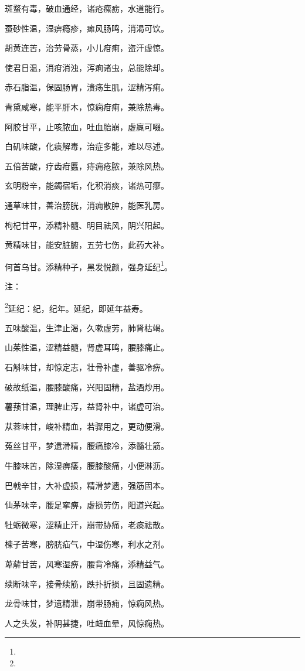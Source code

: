 \documentclass[a4paper,12pt,UTF8,twoside]{ctexbook}
\begin{document}
斑蝥有毒，破血通经，诸疮瘰疬，水道能行。

蚕砂性温，湿痹瘾疹，瘫风肠鸣，消渴可饮。

胡黄连苦，治劳骨蒸，小儿疳痢，盗汗虚惊。

使君日温，消疳消浊，泻痢诸虫，总能除却。

赤石脂温，保固肠胃，溃疡生肌，涩精泻痢。

青黛咸寒，能平肝木，惊痫疳痢，兼除热毒。

阿胶甘平，止咳脓血，吐血胎崩，虚羸可啜。

白矶味酸，化痰解毒，治症多能，难以尽述。

五倍苦酸，疗齿疳䘌，痔痈疮脓，兼除风热。

玄明粉辛，能蠲宿垢，化积消痰，诸热可瘳。

通草味甘，善治膀胱，消痈散肿，能医乳房。

枸杞甘平，添精补髓、明目祛风，阴兴阳起。

黄精味甘，能安脏腑，五劳七伤，此药大补。

何首乌甘。添精种子，黑发悦颜，强身延纪\footnote{}。

注：

\footnote{}延纪：纪，纪年。延纪，即延年益寿。

五味酸温，生津止渴，久嗽虚劳，肺肾枯竭。

山茱性温，涩精益髓，肾虚耳鸣，腰膝痛止。

石斛味甘，却惊定志，壮骨补虚，善驱冷痹。

破故纸温，腰膝酸痛，兴阳固精，盐酒炒用。

薯蓣甘温，理脾止泻，益肾补中，诸虚可治。

苁蓉味甘，峻补精血，若骤用之，更动便滑。

菟丝甘平，梦遗滑精，腰痛膝冷，添髓壮筋。

牛膝味苦，除湿痹痿，腰膝酸痛，小便淋沥。

巴戟辛甘，大补虚损，精滑梦遗，强筋固本。

仙茅味辛，腰足挛痹，虚损劳伤，阳道兴起。

牡蛎微寒，涩精止汗，崩带胁痛，老痰祛散。

楝子苦寒，膀胱疝气，中湿伤寒，利水之剂。

萆薢甘苦，风寒湿痹，腰背冷痛，添精益气。

续断味辛，接骨续筋，跌扑折损，且固遗精。

龙骨味甘，梦遗精泄，崩带肠痈，惊痫风热。

人之头发，补阴甚捷，吐衄血晕，风惊痫热。
\end{document}
